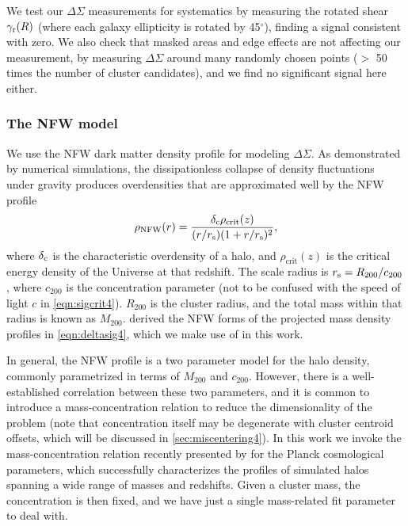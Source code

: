 We test our $\Delta\Sigma$ measurements for systematics by measuring the rotated shear $\gamma_{\rm r}(R)$ (where each galaxy ellipticity is rotated by 45$^{\circ}$), finding a signal consistent with zero. We also check that masked areas and edge effects are not affecting our measurement, by measuring $\Delta\Sigma$ around many randomly chosen points ($>$ 50 times the number of cluster candidates), and we find no significant signal here either.

\subsubsection{The \ac{NFW} model}
\label{sec:nfw4}

We use the \acf{NFW} dark matter density profile \citep{nfw97} for modeling $\Delta\Sigma$. As demonstrated by numerical simulations, the dissipationless collapse of density fluctuations under gravity produces overdensities that are approximated well by the \ac{NFW} profile
\begin{equation}
\rho_{\mathrm{NFW}}(r) = \frac{\delta_{\rm c} \rho_{\mathrm{crit}}(z)}{(r/r_{\rm s})(1+r/r_{\rm s})^2},
\end{equation}
where $\delta_{\rm c}$ is the characteristic overdensity of a halo, and $\rho_{\mathrm{crit}}(z)$ is the critical energy density of the Universe at that redshift. The scale radius is $r_{\rm s} = R_{200}/c_{200}$, where $c_{200}$ is the concentration parameter (not to be confused with the speed of light $c$ in \autoref{eqn:sigcrit4}). $R_{200}$ is the cluster radius, and the total mass within that radius is known as $M_{200}$. \citet{Wright00} derived the \ac{NFW} forms of the projected mass density profiles in \autoref{eqn:deltasig4}, which we make use of in this work.

In general, the \ac{NFW} profile is a two parameter model for the halo density, commonly parametrized in terms of $M_{200}$ and $c_{200}$. However, there is a well-established correlation between these two parameters, and it is common to introduce a mass-concentration relation to reduce the dimensionality of the problem (note that concentration itself may be degenerate with cluster centroid offsets, which will be discussed in \autoref{sec:miscentering4}). In this work we invoke the mass-concentration relation recently presented by \citet{Dutton14} for the \acs{Planck} cosmological parameters, which successfully characterizes the profiles of simulated halos spanning a wide range of masses and redshifts. Given a cluster mass, the concentration is then fixed, and we have just a single mass-related fit parameter to deal with.



